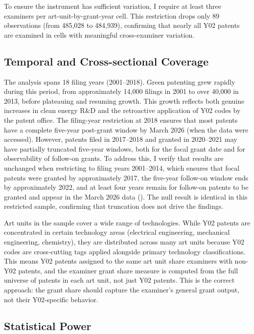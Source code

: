 \documentclass[12pt]{article}
\begin{document}
To ensure the instrument has sufficient variation, I require at least three examiners per art-unit-by-grant-year cell. This restriction drops only 89 observations (from 485,028 to 484,939), confirming that nearly all Y02 patents are examined in cells with meaningful cross-examiner variation.

\subsection{Temporal and Cross-sectional Coverage}

The analysis spans 18 filing years (2001--2018). Green patenting grew rapidly during this period, from approximately 14,000 filings in 2001 to over 40,000 in 2013, before plateauing and resuming growth. This growth reflects both genuine increases in clean energy R\&D and the retroactive application of Y02 codes by the patent office. The filing-year restriction at 2018 ensures that most patents have a complete five-year post-grant window by March 2026 (when the data were accessed). However, patents filed in 2017--2018 and granted in 2020--2021 may have partially truncated five-year windows, both for the focal grant date and for observability of follow-on grants. To address this, I verify that results are unchanged when restricting to filing years 2001--2014, which ensures that focal patents were granted by approximately 2017, the five-year follow-on window ends by approximately 2022, and at least four years remain for follow-on patents to be granted and appear in the March 2026 data (). The null result is identical in this restricted sample, confirming that truncation does not drive the findings.

Art units in the sample cover a wide range of technologies. While Y02 patents are concentrated in certain technology areas (electrical engineering, mechanical engineering, chemistry), they are distributed across many art units because Y02 codes are cross-cutting tags applied alongside primary technology classifications. This means Y02 patents assigned to the same art unit share examiners with non-Y02 patents, and the examiner grant share measure is computed from the full universe of patents in each art unit, not just Y02 patents. This is the correct approach: the grant share should capture the examiner's general grant output, not their Y02-specific behavior.

\subsection{Statistical Power}
\end{document}
